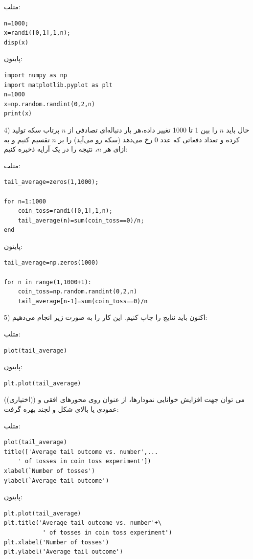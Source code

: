\documentclass{article}
\begin{document}
متلب:
\begin{verbatim}
n=1000;
x=randi([0,1],1,n);
disp(x)
\end{verbatim}
پایتون:
\begin{verbatim}
import numpy as np
import matplotlib.pyplot as plt
n=1000
x=np.random.randint(0,2,n)
print(x)
\end{verbatim}

4) حال باید $n$ را بین 1 تا 1000 تغییر داده،هر بار دنباله‌ای تصادفی از $n$ پرتاب سکه تولید کرده و تعداد دفعاتی که عدد $0$ رخ می‌دهد (سکه رو می‌آید) را بر $n$ تقسیم کنیم و به ازای هر $n$، نتیجه را در یک آرایه ذخیره کنیم:

متلب:
\begin{verbatim}
tail_average=zeros(1,1000);

for n=1:1000
    coin_toss=randi([0,1],1,n);
    tail_average(n)=sum(coin_toss==0)/n;
end
\end{verbatim}
پایتون:
\begin{verbatim}
tail_average=np.zeros(1000)

for n in range(1,1000+1):
    coin_toss=np.random.randint(0,2,n)
    tail_average[n-1]=sum(coin_toss==0)/n
\end{verbatim}

5) اکنون باید نتایج را چاپ کنیم. این کار را به صورت زیر انجام می‌دهیم:

متلب:
\begin{verbatim}
plot(tail_average)
\end{verbatim}
پایتون:
\begin{verbatim}
plt.plot(tail_average)
\end{verbatim}

((اختیاری)) می توان جهت افزایش خوانایی نمودارها، از عنوان روی محورهای افقی و عمودی یا بالای شکل و لجند بهره گرفت:

متلب:

\begin{latin}
\begin{verbatim}
plot(tail_average)
title(['Average tail outcome vs. number',...
    ' of tosses in coin toss experiment'])
xlabel(`Number of tosses')
ylabel(`Average tail outcome')
\end{verbatim}
\end{latin}
پایتون:
\begin{latin}
\begin{verbatim}
plt.plot(tail_average)
plt.title('Average tail outcome vs. number'+\
           ' of tosses in coin toss experiment')
plt.xlabel('Number of tosses')
plt.ylabel('Average tail outcome')
\end{verbatim}
\end{latin}
\end{document}
